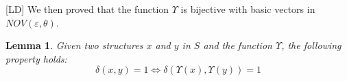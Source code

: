 \documentclass[twoside,11pt]{article}
\newtheorem{lemma}{Lemma}
\def\vec#1{\mathbf{#1}}
\def\svec#1{\vec{#1}}
\def\smallvectors#1{\mathcal{#1}}
\def\R{\mathbb{R}}
\def\df{\Upsilon}
\def\mo{\odot}
\newcounter{properties}
\def\comment#1#2{}
\def\myremove#1{}
\def\myinsert#1{#1}
\def\mysecondremove#1{}
\def\mysecondinsert#1{#1}
\def\LD#1{[{\color{blue}L}D] {\color{blue}#1}}
\begin{document}













\LD{We then proved that the function $\df$ is bijective with basic vectors in $NOV(\varepsilon,\theta)$.}
\begin{lemma}
\label{simpler_lemma}
Given two structures $x$ and $y$ in $S$ and the function $\df$, the following property holds:
$$
\delta(x,y) = 1 \iff \delta(\df(x),\df(y)) = 1
$$
\end{lemma}
\end{document}
